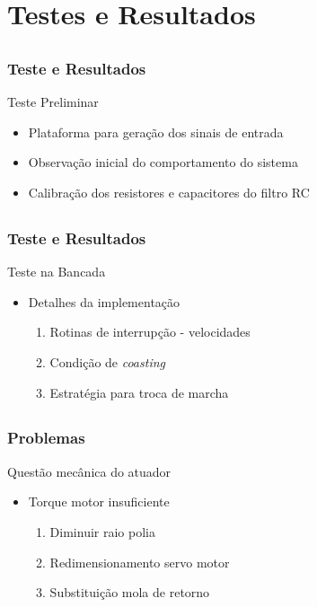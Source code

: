 \documentclass{beamer}
\begin{document}
\section{Testes e Resultados}
\subsection{}
\begin{frame}
 \frametitle{Teste e Resultados}

Teste Preliminar

  \begin{itemize}
    \item Plataforma para geração dos sinais de entrada
    \item Observação inicial do comportamento do sistema
    \item Calibração dos resistores e capacitores do filtro RC
  \end{itemize}
\end{frame}

\subsection{}
\begin{frame}
 \frametitle{Teste e Resultados}

Teste na Bancada
\begin{itemize}
 \item Detalhes da implementação
    \begin{enumerate}
      \item Rotinas de interrupção - velocidades
      \item Condição de \textit{coasting}
      \item Estratégia para troca de marcha
    \end{enumerate}

\end{itemize}
\end{frame}

\subsection{}
\begin{frame}
 \frametitle{Problemas}
Questão mecânica do atuador
  \begin{itemize}
   \item Torque motor insuficiente
    \begin{enumerate}
      \item Diminuir raio polia
      \item Redimensionamento servo motor
      \item Substituição mola de retorno
    \end{enumerate}
  \end{itemize}
\end{frame}
\end{document}
